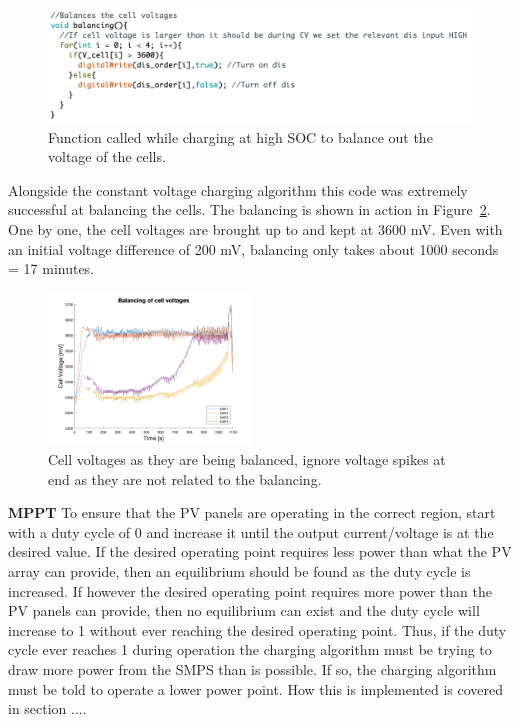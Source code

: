\documentclass[a4paper]{article}
\begin{document}
\begin{figure}[H]
    \centering
    \includegraphics[width = \textwidth]{Balancing_code.png}
    \caption{Function called while charging at high SOC to balance out the voltage of the cells.}
    \vspace{-10pt}
    \label{fig:balancingCode}
\end{figure}

Alongside the constant voltage charging algorithm this code was extremely 
successful at balancing the cells. The balancing is shown in action in Figure~\ref{fig:balancing}. 
One by one, the cell voltages are brought up to and kept at 3600 mV. Even with 
an initial voltage difference of 200 mV, balancing only takes about 
1000 seconds = 17 minutes. 


\begin{figure}[H]
    \centering
    \includegraphics[width=0.48\textwidth]{balancing.png}
    \caption{Cell voltages as they are being balanced, ignore voltage spikes at end as they are not related to the balancing.}
    \label{fig:balancing}
\end{figure}

\textbf{MPPT}
\vspace{10pt} 
\newline
To ensure that the PV panels are operating in the correct region, start with a duty
cycle of 0 and increase it until the output current/voltage is at the desired value.
If the desired operating point requires less power than what the PV array can provide,
then an equilibrium should be found as the duty cycle is increased. If however the 
desired operating point requires more power than the PV panels can provide, then no 
equilibrium can exist and the duty cycle will increase to 1 without ever reaching the
desired operating point. Thus, if the duty cycle ever reaches 1 during operation
the charging algorithm must be trying to draw more power from the SMPS than is 
possible. If so, the charging algorithm must be told to operate a lower power point. How this
is implemented is covered in section ....
\end{document}
